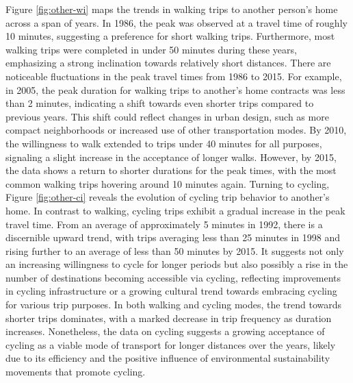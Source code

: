 \documentclass[
11pt, %
oneside, %
english, %
singlespacing, %
]{macthesis} %
\begin{document}
Figure \ref{fig:other-wi} maps the trends in walking trips to another person's home across a span of years. In 1986, the peak was observed at a travel time of roughly 10 minutes, suggesting a preference for short walking trips. Furthermore, most walking trips were completed in under 50 minutes during these years, emphasizing a strong inclination towards relatively short distances.
There are noticeable fluctuations in the peak travel times from 1986 to 2015. For example, in 2005, the peak duration for walking trips to another's home contracts was less than 2 minutes, indicating a shift towards even shorter trips compared to previous years. This shift could reflect changes in urban design, such as more compact neighborhoods or increased use of other transportation modes. By 2010, the willingness to walk extended to trips under 40 minutes for all purposes, signaling a slight increase in the acceptance of longer walks. However, by 2015, the data shows a return to shorter durations for the peak times, with the most common walking trips hovering around 10 minutes again. Turning to cycling, Figure \ref{fig:other-ci} reveals the evolution of cycling trip behavior to another's home. In contrast to walking, cycling trips exhibit a gradual increase in the peak travel time. From an average of approximately 5 minutes in 1992, there is a discernible upward trend, with trips averaging less than 25 minutes in 1998 and rising further to an average of less than 50 minutes by 2015. It suggests not only an increasing willingness to cycle for longer periods but also possibly a rise in the number of destinations becoming accessible via cycling, reflecting improvements in cycling infrastructure or a growing cultural trend towards embracing cycling for various trip purposes. In both walking and cycling modes, the trend towards shorter trips dominates, with a marked decrease in trip frequency as duration increases. Nonetheless, the data on cycling suggests a growing acceptance of cycling as a viable mode of transport for longer distances over the years, likely due to its efficiency and the positive influence of environmental sustainability movements that promote cycling.
\end{document}
